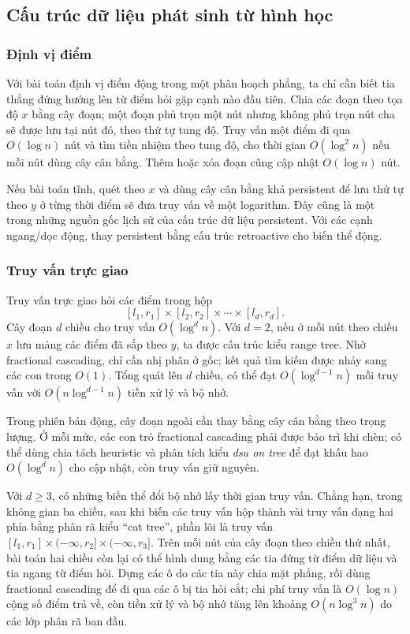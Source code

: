 \documentclass[11pt]{article}
\begin{document}
\subsection{Cấu trúc dữ liệu phát sinh từ hình học}

\subsubsection{Định vị điểm}

Với bài toán định vị điểm động trong một phân hoạch phẳng, ta chỉ cần biết tia
thẳng đứng hướng lên từ điểm hỏi gặp cạnh nào đầu tiên. Chia các đoạn theo tọa
độ $x$ bằng cây đoạn; một đoạn phủ trọn một nút nhưng không phủ trọn nút cha sẽ
được lưu tại nút đó, theo thứ tự tung độ. Truy vấn một điểm đi qua $O(\log n)$
nút và tìm tiền nhiệm theo tung độ, cho thời gian $O(\log^2 n)$ nếu mỗi nút
dùng cây cân bằng. Thêm hoặc xóa đoạn cũng cập nhật $O(\log n)$ nút.

Nếu bài toán tĩnh, quét theo $x$ và dùng cây cân bằng khả persistent để lưu thứ
tự theo $y$ ở từng thời điểm sẽ đưa truy vấn về một logarithm. Đây cũng là một
trong những nguồn gốc lịch sử của cấu trúc dữ liệu persistent. Với các cạnh
ngang/dọc động, thay persistent bằng cấu trúc retroactive cho biến thể động.

\subsubsection{Truy vấn trực giao}

Truy vấn trực giao hỏi các điểm trong hộp
\[
  [l_1,r_1]\times[l_2,r_2]\times\cdots\times[l_d,r_d].
\]
Cây đoạn $d$ chiều cho truy vấn $O(\log^d n)$. Với $d=2$, nếu ở mỗi nút theo
chiều $x$ lưu mảng các điểm đã sắp theo $y$, ta được cấu trúc kiểu range tree.
Nhờ fractional cascading, chỉ cần nhị phân ở gốc; kết quả tìm kiếm được nhảy
sang các con trong $O(1)$. Tổng quát lên $d$ chiều, có thể đạt
$O(\log^{d-1}n)$ mỗi truy vấn với $O(n\log^{d-1}n)$ tiền xử lý và bộ nhớ.

Trong phiên bản động, cây đoạn ngoài cần thay bằng cây cân bằng theo trọng
lượng. Ở mỗi mức, các con trỏ fractional cascading phải được bảo trì khi chèn;
có thể dùng chia tách heuristic và phân tích kiểu \emph{dsu on tree} để đạt
khấu hao $O(\log^d n)$ cho cập nhật, còn truy vấn giữ nguyên.

Với $d\ge 3$, có những biến thể đổi bộ nhớ lấy thời gian truy vấn. Chẳng hạn,
trong không gian ba chiều, sau khi biến các truy vấn hộp thành vài truy vấn
dạng hai phía bằng phân rã kiểu ``cat tree'', phần lõi là truy vấn
$[l_1,r_1]\times(-\infty,r_2]\times(-\infty,r_3]$. Trên mỗi nút của cây đoạn
theo chiều thứ nhất, bài toán hai chiều còn lại có thể hình dung bằng các tia
đứng từ điểm dữ liệu và tia ngang từ điểm hỏi. Dựng các ô do các tia này chia
mặt phẳng, rồi dùng fractional cascading để đi qua các ô bị tia hỏi cắt; chi
phí truy vấn là $O(\log n)$ cộng số điểm trả về, còn tiền xử lý và bộ nhớ tăng
lên khoảng $O(n\log^3 n)$ do các lớp phân rã ban đầu.
\end{document}
